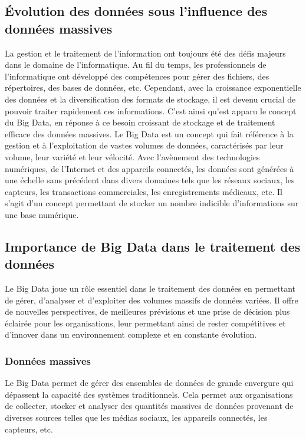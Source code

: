 \documentclass{article}
\begin{document}
	\subsection{Évolution des données sous l’influence des données massives}
	La gestion et le traitement de l’information ont toujours été des défis majeurs dans le domaine de l’informatique. Au fil du temps, les professionnels de l’informatique ont développé des compétences pour gérer des fichiers, des répertoires, des bases de données, etc. Cependant, avec la croissance exponentielle des données et la diversification des formats de stockage, il est devenu crucial de pouvoir traiter rapidement ces informations. C’est ainsi qu’est apparu le concept du Big Data, en réponse à ce besoin croissant de stockage et de traitement efficace des données massives. Le Big Data est un concept qui fait référence à la gestion et à l’exploitation de vastes volumes de données, caractérisés par leur volume, leur variété et leur vélocité. Avec l’avènement des technologies numériques, de l’Internet et des appareils connectés, les données sont générées à une échelle sans précédent dans divers domaines tels que les réseaux sociaux, les capteurs, les transactions commerciales, les enregistrements médicaux, etc. Il s’agit d’un concept permettant de stocker un nombre indicible d’informations sur une base numérique.
	
	\subsection{Importance de Big Data dans le traitement des données}
	Le Big Data joue un rôle essentiel dans le traitement des données en permettant de gérer, d’analyser et d’exploiter des volumes massifs de données variées. Il offre de nouvelles perspectives, de meilleures prévisions et une prise de décision plus éclairée pour les organisations, leur permettant ainsi de rester compétitives et d’innover dans un environnement complexe et en constante évolution.
	
	\subsubsection{Données massives}
	Le Big Data permet de gérer des ensembles de données de grande envergure qui dépassent la capacité des systèmes traditionnels. Cela permet aux organisations de collecter, stocker et analyser des quantités massives de données provenant de diverses sources telles que les médias sociaux, les appareils connectés, les capteurs, etc.
	
\end{document}
